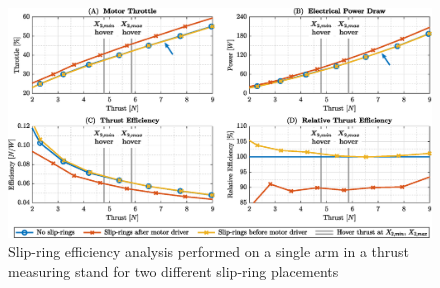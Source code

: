\documentclass[conference]{IEEEtran}
\begin{document}
\begin{figure}[t!]
	\includegraphics[width=\textwidth]{img/2_slipring_loss.eps}
	\centering
	\vspace{-4pt}
	\caption{Slip-ring efficiency analysis performed on a single arm in a thrust measuring stand for two different slip-ring placements}
	\label{fig:2_slipring_loss}
	\vspace{-4pt}
\end{figure}

\end{document}
